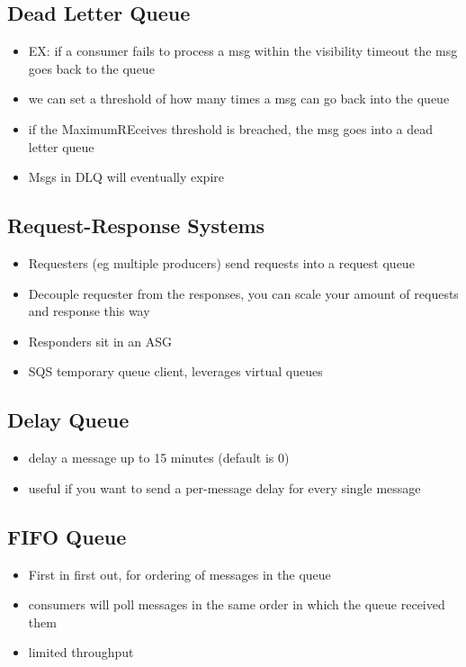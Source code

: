 \documentclass[]{scrartcl}
\begin{document}
\subsection{Dead Letter Queue}
\begin{itemize}
	\item EX: if a consumer fails to process a msg within the visibility timeout the msg goes back to the queue
	\item we can set a threshold of how many times a msg can go back into the queue
	\item if the MaximumREceives threshold is breached, the msg goes into a dead letter queue
	\item Msgs in DLQ will eventually expire
\end{itemize}

\subsection{Request-Response Systems}
\begin{itemize}
	\item Requesters (eg multiple producers) send requests into a request queue
	\item Decouple requester from the responses, you can scale your amount of requests and response this way
	\item Responders sit in an ASG
	\item SQS temporary queue client, leverages virtual queues
\end{itemize}

\subsection{Delay Queue}
\begin{itemize}
	\item delay a message up to 15 minutes (default is 0)
	\item useful if you want to send a per-message delay for every single message
\end{itemize}

\subsection{FIFO Queue}
\begin{itemize}
	\item First in first out, for ordering of messages in the queue
	\item consumers will poll messages in the same order in which the queue received them
	\item limited throughput
\end{itemize}
\end{document}
